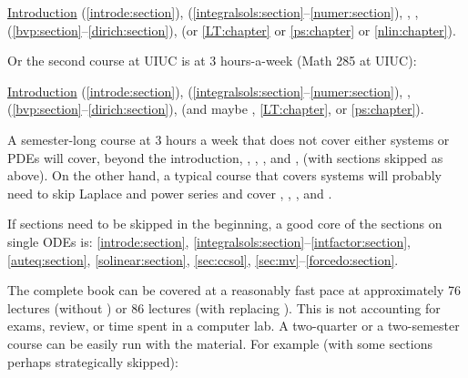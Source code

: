\medskip

\noindent
\hyperref[intro:chapter]{Introduction} (\ref{introde:section}),
 (\ref{integralsols:section}--\ref{numer:section}),
,
,
 (\ref{bvp:section}--\ref{dirich:section}),
 (or
\ref{LT:chapter} or \ref{ps:chapter} or \ref{nlin:chapter}).

\medskip

Or the second course at UIUC is at 3 hours-a-week (Math 285 at UIUC):

\medskip

\noindent
\hyperref[intro:chapter]{Introduction} (\ref{introde:section}),
 (\ref{integralsols:section}--\ref{numer:section}),
,
 (\ref{bvp:section}--\ref{dirich:section}),
(and maybe ,
\ref{LT:chapter}, or \ref{ps:chapter}).

\medskip

A semester-long course at 3 hours a week that does not cover either systems
or PDEs
will cover, beyond the introduction,
,
,
, and ,
(with sections skipped as above).
On the other hand, a typical course that covers 
systems will probably need to skip Laplace and power series
and cover
,
,
, and .

\medskip

If sections need to be skipped in the beginning, a good core of the 
sections on single ODEs is:
\ref{introde:section},
\ref{integralsols:section}--\ref{intfactor:section},
\ref{auteq:section},
\ref{solinear:section},
\ref{sec:ccsol},
\ref{sec:mv}--\ref{forcedo:section}.

\medskip

The complete book can be covered at a reasonably
fast pace at approximately 76 lectures
(without )
or 86 lectures (with  replacing
).
This is not accounting for exams, review,
or time spent in a computer lab. %
A two-quarter or a two-semester course can be easily run with the material.
For example (with some sections perhaps strategically skipped):

\medskip

